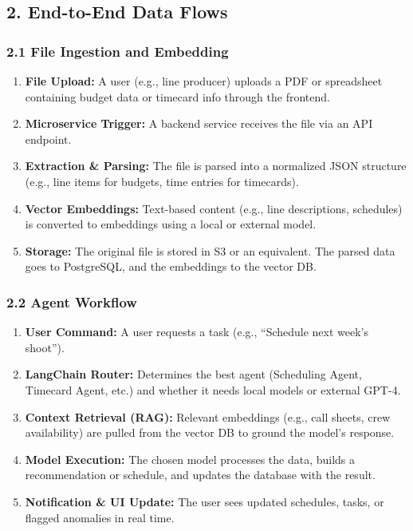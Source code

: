\documentclass[11pt]{article}
\begin{document}
\subsection{2. End-to-End Data Flows}

\subsubsection{2.1 File Ingestion and Embedding}
\begin{enumerate}
    \item \textbf{File Upload:} A user (e.g., line producer) uploads a PDF or spreadsheet containing budget data or timecard info through the frontend.
    \item \textbf{Microservice Trigger:} A backend service receives the file via an API endpoint.
    \item \textbf{Extraction \& Parsing:} The file is parsed into a normalized JSON structure (e.g., line items for budgets, time entries for timecards).
    \item \textbf{Vector Embeddings:} Text-based content (e.g., line descriptions, schedules) is converted to embeddings using a local or external model.
    \item \textbf{Storage:} The original file is stored in S3 or an equivalent. The parsed data goes to PostgreSQL, and the embeddings to the vector DB.
\end{enumerate}

\subsubsection{2.2 Agent Workflow}
\begin{enumerate}
    \item \textbf{User Command:} A user requests a task (e.g., “Schedule next week’s shoot”).
    \item \textbf{LangChain Router:} Determines the best agent (Scheduling Agent, Timecard Agent, etc.) and whether it needs local models or external GPT-4.
    \item \textbf{Context Retrieval (RAG):} Relevant embeddings (e.g., call sheets, crew availability) are pulled from the vector DB to ground the model’s response.
    \item \textbf{Model Execution:} The chosen model processes the data, builds a recommendation or schedule, and updates the database with the result.
    \item \textbf{Notification \& UI Update:} The user sees updated schedules, tasks, or flagged anomalies in real time.
\end{enumerate}
\end{document}
